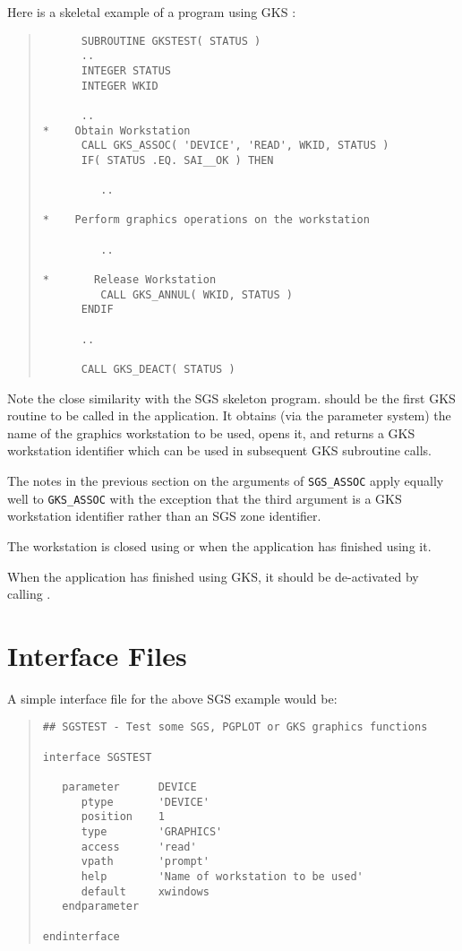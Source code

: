 Here is a skeletal example of a program using GKS :
\begin{quote}
\begin{verbatim}
      SUBROUTINE GKSTEST( STATUS )
      ..
      INTEGER STATUS
      INTEGER WKID

      ..
*    Obtain Workstation
      CALL GKS_ASSOC( 'DEVICE', 'READ', WKID, STATUS )
      IF( STATUS .EQ. SAI__OK ) THEN

         ..

*    Perform graphics operations on the workstation

         ..

*       Release Workstation
         CALL GKS_ANNUL( WKID, STATUS )
      ENDIF

      ..

      CALL GKS_DEACT( STATUS )
\end{verbatim}
\end{quote}

Note the close similarity with the SGS skeleton program. 
 should be
the first GKS routine to be called in the application. It obtains (via the
parameter system) the name of the graphics workstation to be used, opens it,
and returns a GKS workstation identifier which can be used in subsequent GKS
subroutine calls.

The notes in the previous section on the arguments of {\tt SGS\_ASSOC}
 apply equally
well to {\tt GKS\_ASSOC} with the exception that the third argument is a GKS
workstation identifier rather than an SGS zone identifier.

The workstation is closed using 
 or 
when the application has finished using it.

When the application has finished using GKS, it should be de-activated by
calling .

\section{Interface Files}
\label{ifl}
A simple interface file for the above SGS example would be:
\begin{quote}
\begin{verbatim}
## SGSTEST - Test some SGS, PGPLOT or GKS graphics functions

interface SGSTEST

   parameter      DEVICE
      ptype       'DEVICE'
      position    1
      type        'GRAPHICS'
      access      'read'
      vpath       'prompt'
      help        'Name of workstation to be used'
      default     xwindows
   endparameter

endinterface
\end{verbatim}
\end{quote}

